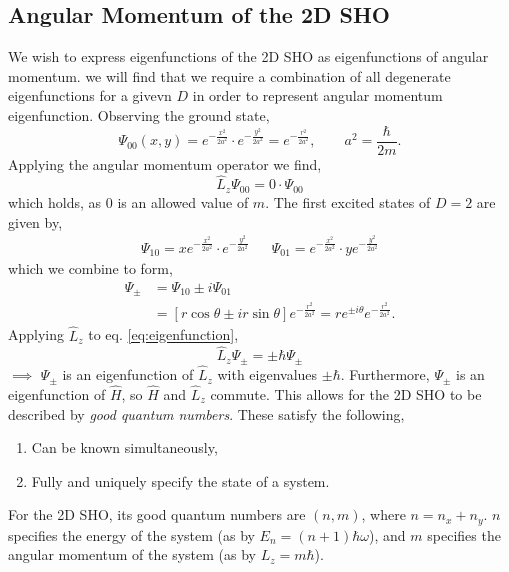 \documentclass{book}
\begin{document}
\subsection{Angular Momentum of the 2D SHO}
We wish to express eigenfunctions of the 2D SHO as eigenfunctions of angular momentum. we will find that we require a combination of all degenerate eigenfunctions for a givevn $D$ in order to represent angular momentum eigenfunction. Observing the ground state,
\begin{equation}
	\Psi_{00}(x,y) = e^{-\frac{x^2}{2a^2}}\cdot e^{-\frac{y^2}{2a^2}} = e^{-\frac{r^2}{2a^2}}, \hspace{2em} a^2 = \frac{\hbar}{2m}.
\end{equation}
Applying the angular momentum operator we find,
\begin{equation}
	\hat{L}_z\Psi_{00} = 0 \cdot \Psi_{00}
\end{equation}
which holds, as $0$ is an allowed value of $m$. The first excited states of $D=2$ are given by,
\begin{align}
	\Psi_{10} = x e^{-\frac{x^2}{2a^2}} \cdot e^{-\frac{y^2}{2a^2}} && \Psi_{01} = e^{-\frac{x^2}{2a^2}} \cdot ye^{-\frac{y^2}{2a^2}}
\end{align}
which we combine to form,
\begin{equation}
	\begin{split}
	\Psi_{\pm} &= \Psi_{10} \pm i\Psi_{01} \\
	& = \left[r\cos\theta \pm ir\sin\theta\right]e^{-\frac{r^2}{2a^2}} = re^{\pm i\theta}e^{-\frac{r^2}{2a^2}}. \label{eq:eigenfunction}
	\end{split}
\end{equation}
Applying $\hat{L}_z$ to eq. \eqref{eq:eigenfunction},
\begin{equation}
	\hat{L}_z\Psi_{\pm} = \pm \hbar \Psi_{\pm}
\end{equation}
$\implies$ $\Psi_{\pm}$ is an eigenfunction of $\hat{L}_z$ with eigenvalues $\pm \hbar$. Furthermore, $\Psi_{\pm}$ is an eigenfunction of $\hat{H}$, so $\hat{H}$ and $\hat{L}_z$ commute. This allows for the 2D SHO to be described by \textit{good quantum numbers}. These satisfy the following,
\begin{enumerate}
	\item Can be known simultaneously,
	\item Fully and uniquely specify the state of a system.
\end{enumerate}
For the 2D SHO, its good quantum numbers are $(n,m)$, where $n = n_x + n_y$. $n$ specifies the energy of the system (as by $E_n = (n + 1)\hbar \omega$), and $m$ specifies the angular momentum of the system (as by $L_z = m\hbar$). 
\end{document}
